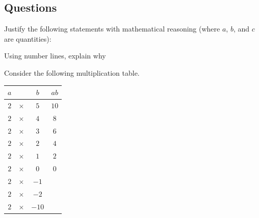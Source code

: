\subsection*{Questions}
\begin{questions}
  \question Justify the following statements with mathematical reasoning (where $ a$, $ b$, and $c$ are quantities):
  \question Using number lines, explain why
  \question Consider the following multiplication table.
            \begin{center}
              \def\arraystretch{1.5}
              \begin{tabular}{|ccc|c|}\hline
                $ a $ && $ b $ & $ ab $\\\hline
                $ 2 $ & $ \times $ & $ 5 $ & $ 10 $\\\hline
                $ 2 $ & $ \times $ & $ 4 $ & $ 8 $\\\hline
                $ 2 $ & $ \times $ & $ 3 $ & $ 6 $\\\hline
                $ 2 $ & $ \times $ & $ 2 $ & $ 4 $\\\hline
                $ 2 $ & $ \times $ & $ 1 $ & $ 2 $\\\hline
                $ 2 $ & $ \times $ & $ 0 $ & $ 0 $\\\hline\hline
                $ 2 $ & $ \times $ & $ -1 $ &\\\hline
                $ 2 $ & $ \times $ & $ -2 $ &\\\hline\hline
                $ 2 $ & $ \times $ & $ -10 $ &\\\hline
              \end{tabular}
            \end{center}
    \begin{parts}

\end{parts}
\end{questions}
